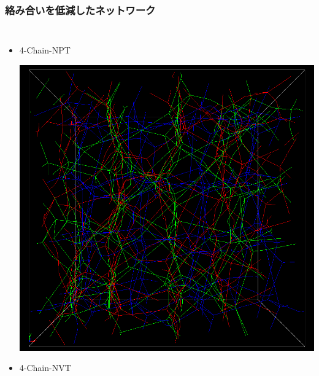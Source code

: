 \documentclass[12pt, dvipdfmx]{beamer}
\begin{document}
\begin{frame}
    \frametitle{絡み合いを低減したネットワーク}
        \vspace{-3mm}
		\begin{columns}[T, onlytextwidth]
                \small
				\begin{itemize}
					\item 4-Chain-\alert{NPT}
					
					\includegraphics[width=.62\textwidth]{NPT_PPA.png}
					\item 4-Chain-NVT
					

\end{itemize}
\end{columns}
\end{frame}
\end{document}
